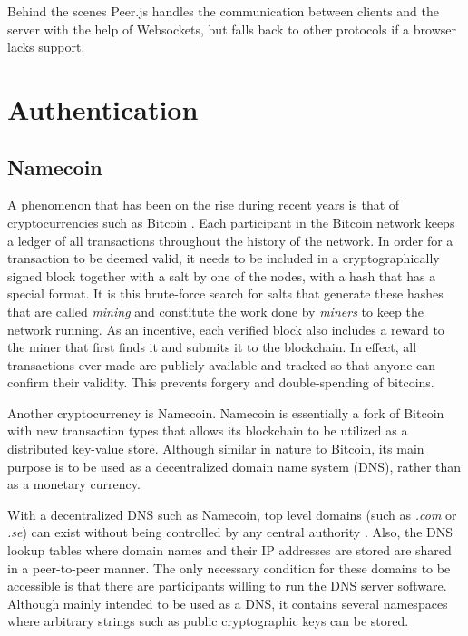 Behind the scenes Peer.js handles the communication between clients and the server with the help of Websockets, but falls back to other protocols if a browser lacks support.


\section{Authentication}

\subsection{Namecoin}
A phenomenon that has been on the rise during recent years is that of cryptocurrencies such as Bitcoin \cite{CryptoCoinInsider:2014:Online}. Each participant in the Bitcoin network keeps a ledger of all transactions throughout the history of the network. In order for a transaction to be deemed valid, it needs to be included in a cryptographically signed block together with a salt by one of the nodes, with a hash that has a special format. It is this brute-force search for salts that generate these hashes that are called \emph{mining} and constitute the work done by \emph{miners} to keep the network running. As an incentive, each verified block also includes a reward to the miner that first finds it and submits it to the blockchain\cite{InternetForBeginners:2014:Online}. In effect, all transactions ever made are publicly available and tracked so that anyone can confirm their validity. This prevents forgery and double-spending of bitcoins.

Another cryptocurrency is Namecoin\cite{CryptoCoinInsider:2014:Online}. Namecoin is essentially a fork of Bitcoin with new transaction types that allows its blockchain to be utilized as a distributed key-value store. Although similar in nature to Bitcoin, its main purpose is to be used as a decentralized domain name system (DNS), rather than as a monetary currency.

With a decentralized DNS such as Namecoin, top level domains (such as \emph{.com} or \emph{.se}) can exist without being controlled by any central authority \cite{CryptoCoinInsider:2014:Online}. Also, the DNS lookup tables where domain names and their IP addresses are stored are shared in a peer-to-peer manner. The only necessary condition for these domains to be accessible is that there are participants willing to run the DNS server software. Although mainly intended to be used as a DNS, it contains several namespaces where arbitrary strings such as public cryptographic keys can be stored.

